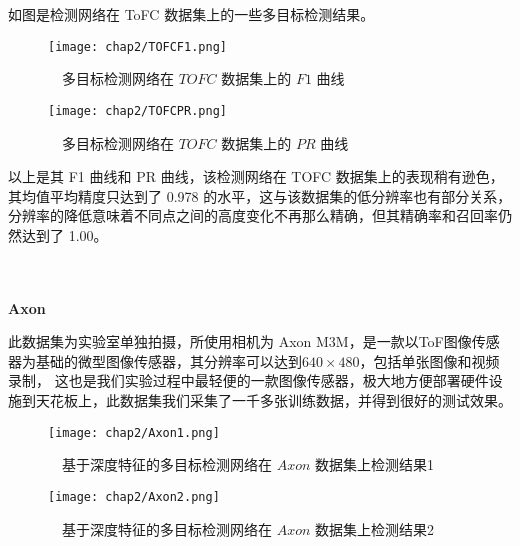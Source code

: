 如图是检测网络在 ToFC 数据集上的一些多目标检测结果。

\begin{figure}[htbp]
	\begin{minipage}{0.48\linewidth}
		\centering
		\texttt{[image: chap2/TOFCF1.png]}
		\caption{\ \ 多目标检测网络在 $TOFC$ 数据集上的 $F1$ 曲线}
		\label{fig2-12}%
	\end{minipage}
	\begin{minipage}{0.48\linewidth}
		\centering
		\texttt{[image: chap2/TOFCPR.png]}
		\caption{\ \ 多目标检测网络在 $TOFC$ 数据集上的 $PR$ 曲线}
		\label{fig2-13}%
	\end{minipage}
\end{figure}
\vspace{3mm}

以上是其 F1 曲线和 PR 曲线，该检测网络在 TOFC 数据集上的表现稍有逊色，其均值平均精度只达到了 0.978 的水平，这与该数据集的低分辨率也有部分关系，
分辨率的降低意味着不同点之间的高度变化不再那么精确，但其精确率和召回率仍然达到了 1.00。

\\ \hspace*{\fill} \\
\textbf{Axon}
	
此数据集为实验室单独拍摄，所使用相机为 Axon M3M，是一款以ToF图像传感器为基础的微型图像传感器，其分辨率可以达到$640\times 480$，包括单张图像和视频录制，
这也是我们实验过程中最轻便的一款图像传感器，极大地方便部署硬件设施到天花板上，此数据集我们采集了一千多张训练数据，并得到很好的测试效果。
\begin{figure}[htbp]
	\centering
	\begin{minipage}{0.48\linewidth}
		\centering
		\texttt{[image: chap2/Axon1.png]}
		\caption{\ \ 基于深度特征的多目标检测网络在 $Axon$ 数据集上检测结果1}
		\label{fig2-14}%
	\end{minipage}
	\begin{minipage}{0.48\linewidth}
		\centering
		\texttt{[image: chap2/Axon2.png]}
		\caption{\ \ 基于深度特征的多目标检测网络在 $Axon$ 数据集上检测结果2}
		\label{fig2-15}%
	\end{minipage}
\end{figure}

